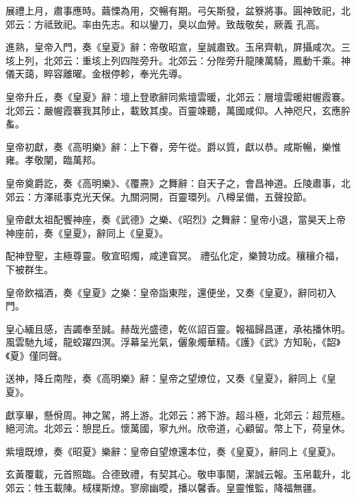 \begin{pinyinscope}
 展禮上月，肅事應時。繭慄為用，交暢有期。弓矢斯發，盆簝將事。圓神致祀，北郊云：方祗致祀。率由先志。和以鑾刀，臭以血膋。致哉敬矣，厥義
 孔高。



 進熟，皇帝入門，奏《皇夏》辭：帝敬昭宣，皇誠肅致。玉帛齊軌，屏攝咸次。三垓上列，北郊云：重垓上列四陛旁升。北郊云：分陛旁升龍陳萬騎，鳳動千乘。神儀天藹，睟容離曜。金根停軫，奉光先導。



 皇帝升丘，奏《皇夏》辭：壇上登歌辭同紫壇雲暖，北郊云：層壇雲暖紺幄霞褰。北郊云：嚴幄霞褰我其陟止，載致其虔。百靈竦聽，萬國咸仰。人神咫尺，玄應肸蚃。



 皇帝初獻，奏《高明樂》辭：上下眷，旁午從。爵以質，獻以恭。咸斯暢，樂惟雍。孝敬闡，臨萬邦。



 皇帝奠爵訖，奏《高明樂》、《覆燾》之舞辭：自天子之，會昌神道。丘陵肅事，北郊云：方澤祗事克光天保。九關洞開，百靈環列。八樽呈備，五聲投節。



 皇帝獻太祖配饗神座，奏《武德》之樂、《昭烈》之舞辭：皇帝小退，當昊天上帝神座前，奏《皇夏》，辭同上《皇夏》。



 配神登聖，主極尊靈。敬宣昭燭，咸達窅冥。
 禮弘化定，樂贊功成。穰穰介福，下被群生。



 皇帝飲福酒，奏《皇夏》之樂：皇帝詣東陛，還便坐，又奏《皇夏》，辭同初入門。



 皇心緬且感，吉蠲奉至誠。赫哉光盛德，乾巛詔百靈。報福歸昌運，承祐播休明。風雲馳九域，龍蛟躍四溟。浮幕呈光氣，儷象燭華精。《護》《武》方知恥，《韶》《夏》僅同聲。



 送神，降丘南陛，奏《高明樂》辭：皇帝之望燎位，又奏《皇夏》，辭同上《皇夏》。



 獻享畢，懸佾周。神之駕，將上游。北郊云：將下游。超斗極，北郊云：超荒極。絕河流。北郊云：憩昆丘。懷萬國，寧九州。欣帝道，心顧留。幣上下，荷皇休。



 紫壇既燎，奏《昭夏》樂辭：皇帝自望燎還本位，奏《皇夏》，辭同上《皇夏》。



 玄黃覆載，元首照臨。合德致禮，有契其心。敬申事闋，潔誠云報。玉帛載升，北郊云：牲玉載陳。棫樸斯燎。寥廓幽曖，播以馨香。皇靈惟監，降福無疆。




\end{pinyinscope}
